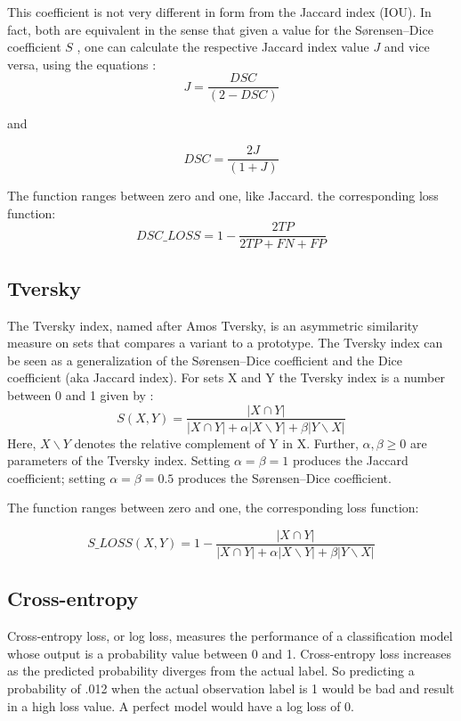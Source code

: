 This coefficient is not very different in form from the Jaccard index (IOU). In fact, both are equivalent in the sense that given a value for the Sørensen–Dice coefficient $S$ , one can calculate the respective Jaccard index value $J$  and vice versa, using the equations : 
\begin{equation}
    J = \frac{DSC}{( 2 − DSC )}
\end{equation}

and 

\begin{equation}
    DSC = \frac{2 J  }{( 1 + J )}
\end{equation}

The function ranges between zero and one, like Jaccard. the corresponding loss function:
\begin{equation}
    DSC\_LOSS = 1 - \frac{2 TP}{2 TP + FN + FP}
\end{equation}

\subsection{Tversky}
\hspace{\parindent}
The Tversky index, named after Amos Tversky, is an asymmetric similarity measure on sets that compares a variant to a prototype. The Tversky index can be seen as a generalization of the Sørensen–Dice coefficient and the Dice coefficient (aka Jaccard index).
For sets X and Y the Tversky index is a number between 0 and 1 given by :
\begin{equation}
    S(X, Y) = \frac{| X \cap Y |}{| X \cap Y | + \alpha|X  ∖ Y| + \beta | Y  ∖  X|}
\end{equation}
Here, $X ∖ Y$ denotes the relative complement of Y in X. 
Further, $\alpha , \beta \geq 0$  are parameters of the Tversky index. Setting $\alpha = \beta = 1$ produces the Jaccard coefficient; setting $\alpha = \beta = 0.5$  produces the Sørensen–Dice coefficient. 

The function ranges between zero and one, the corresponding loss function:

\begin{equation}
    S\_LOSS(X, Y) =  1 - \frac{| X \cap Y |}{| X \cap Y | + \alpha|X  ∖ Y| + \beta | Y  ∖  X|}
\end{equation}

\subsection{Cross-entropy}
\hspace{\parindent}
Cross-entropy loss, or log loss, measures the performance of a classification model whose output is a probability value between 0 and 1. Cross-entropy loss increases as the predicted probability diverges from the actual label. So predicting a probability of .012 when the actual observation label is 1 would be bad and result in a high loss value. A perfect model would have a log loss of 0.

